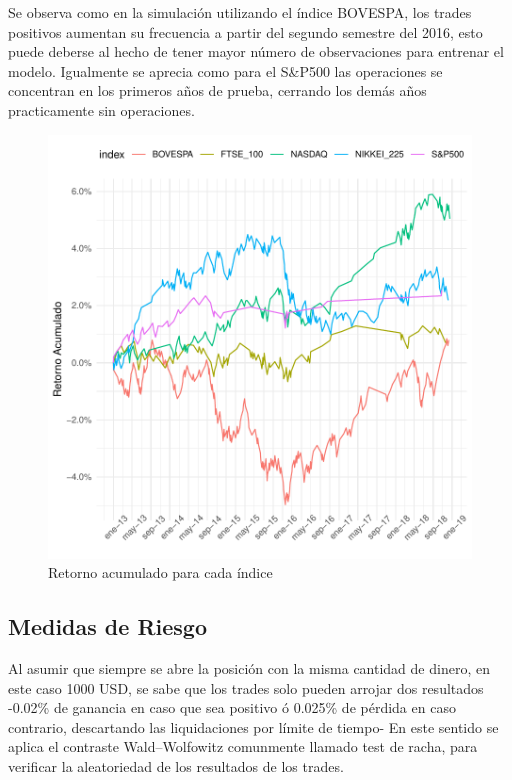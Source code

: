 \documentclass[a4paper,12pt]{Latex/Classes/PhDthesisPSnPDF}
\begin{document}
Se observa como en la simulación utilizando el índice BOVESPA, los trades positivos aumentan su frecuencia a partir del segundo semestre del 2016, esto puede deberse al hecho de tener mayor número de observaciones para entrenar el modelo. Igualmente se aprecia como para el S\&P500 las operaciones se concentran en los primeros años de prueba, cerrando los demás años practicamente sin operaciones.


\begin{figure}[H]
\centering
\includegraphics{main-031}
\caption{Retorno acumulado para cada índice}
\end{figure}

\subsection{Medidas de Riesgo}

Al asumir que siempre se abre la posición con la misma cantidad de dinero, en este caso 1000 USD, se sabe que los trades solo pueden arrojar dos resultados -0.02\% de ganancia en caso que sea positivo ó 0.025\% de pérdida en caso contrario, descartando las liquidaciones por límite de tiempo- En este sentido se aplica el contraste Wald–Wolfowitz comunmente llamado test de racha, para verificar la aleatoriedad de los resultados de los trades.
\end{document}
